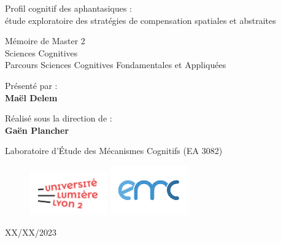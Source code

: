 \begin{titlepage}
    \begin{center}
        \vspace*{1cm}

        \Huge
        Profil cognitif des aphantasiques :\\ étude exploratoire des stratégies de compensation spatiales et abstraites

        \vspace{0.5cm}
        \normalsize
        Mémoire de Master 2\\ 
        \Large
        Sciences Cognitives\\ 
        \vspace{0.1cm}
        \normalsize
        Parcours Sciences Cognitives Fondamentales et Appliquées
            
        \vfill
        
        \normalsize
        Présenté par :\\ 
        \large
        \textbf{Maël Delem}\\ 
        
        \vspace{0.3cm} 
        
        \normalsize
        Réalisé sous la direction de :\\
        \large
        \textbf{Gaën Plancher}\\ 
        
        \vspace{0.7cm}
        
        \large        
        Laboratoire d'Étude des Mécanismes Cognitifs (EA 3082)\\

        \begin{figure}[H]
          \centering
          \includegraphics[width=0.3\textwidth]{./zd_logo/logo.png}
          \includegraphics[width=0.3\textwidth]{./zd_logo/logo_emc.png}
        \end{figure}
        
        XX/XX/2023
            
    \end{center}
\end{titlepage}

\newpage{}
